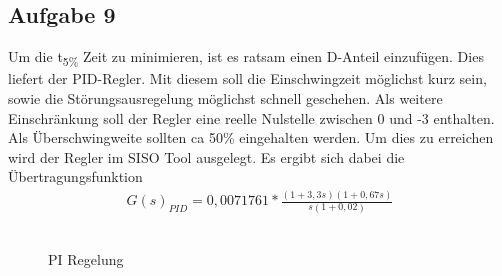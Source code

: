 \documentclass[10pt]{scrartcl}
\begin{document}
\subsection{Aufgabe 9}	
Um die t\textsubscript{5\%} Zeit zu minimieren, ist es ratsam einen D-Anteil einzufügen. Dies liefert der PID-Regler.
Mit diesem soll die Einschwingzeit möglichst kurz sein, sowie die Störungsausregelung möglichst schnell geschehen. Als weitere Einschränkung soll der Regler eine reelle Nulstelle zwischen 0 und -3 enthalten. Als Überschwingweite sollten ca 50\% eingehalten werden.
Um dies zu erreichen wird der Regler im SISO Tool ausgelegt.
Es ergibt sich dabei die Übertragungsfunktion
\begin{align}
   G(s)_{PID}=0,0071761*\frac{(1+3,3s)(1+0,67s)}{s(1+0,02)}
\end{align} \\
\begin{figure} [H]
\begin{center}
\caption{PI Regelung } 
\end{center}
\end{figure}
\end{document}
